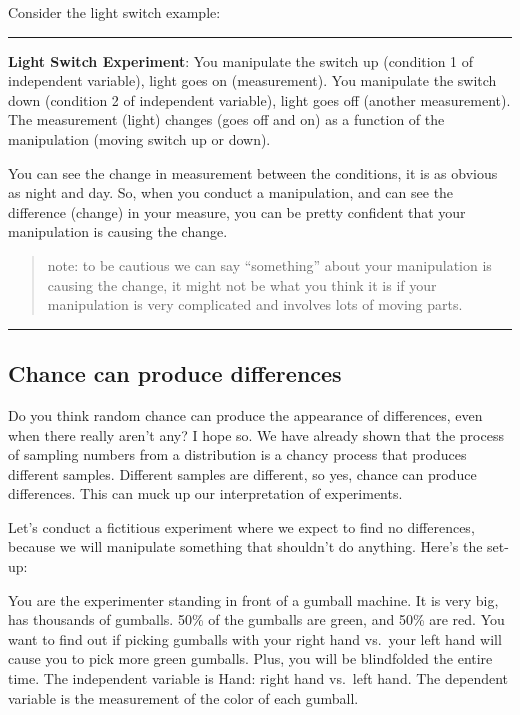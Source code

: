 \documentclass[
]{book}
\begin{document}
Consider the light switch example:

\begin{center}\rule{0.5\linewidth}{0.5pt}\end{center}

\textbf{Light Switch Experiment}: You manipulate the switch up (condition 1 of independent variable), light goes on (measurement). You manipulate the switch down (condition 2 of independent variable), light goes off (another measurement). The measurement (light) changes (goes off and on) as a function of the manipulation (moving switch up or down).

You can see the change in measurement between the conditions, it is as obvious as night and day. So, when you conduct a manipulation, and can see the difference (change) in your measure, you can be pretty confident that your manipulation is causing the change.

\begin{quote}
note: to be cautious we can say ``something'' about your manipulation is causing the change, it might not be what you think it is if your manipulation is very complicated and involves lots of moving parts.
\end{quote}

\begin{center}\rule{0.5\linewidth}{0.5pt}\end{center}

\subsection{Chance can produce differences}\label{chance-can-produce-differences}

Do you think random chance can produce the appearance of differences, even when there really aren't any? I hope so. We have already shown that the process of sampling numbers from a distribution is a chancy process that produces different samples. Different samples are different, so yes, chance can produce differences. This can muck up our interpretation of experiments.

Let's conduct a fictitious experiment where we expect to find no differences, because we will manipulate something that shouldn't do anything. Here's the set-up:

You are the experimenter standing in front of a gumball machine. It is very big, has thousands of gumballs. 50\% of the gumballs are green, and 50\% are red. You want to find out if picking gumballs with your right hand vs.~your left hand will cause you to pick more green gumballs. Plus, you will be blindfolded the entire time. The independent variable is Hand: right hand vs.~left hand. The dependent variable is the measurement of the color of each gumball.
\end{document}
